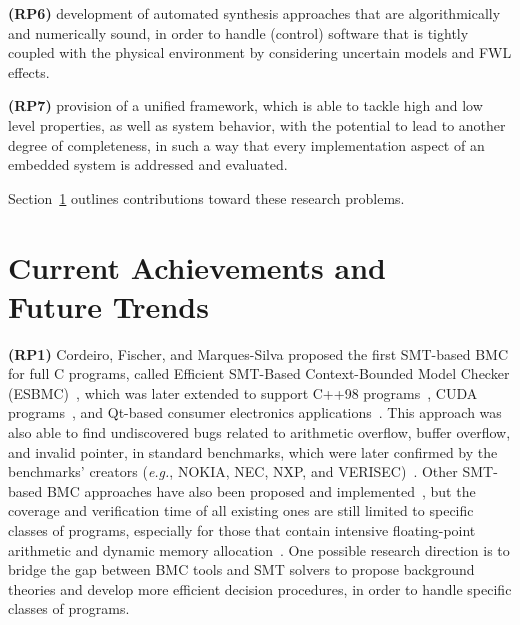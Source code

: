 \documentclass{acm_sen_article}
\begin{document}
\textbf{(RP6)} development of automated synthesis approaches that are algorithmically and numerically sound, in order to handle (control) software that is tightly coupled with the physical environment by considering uncertain models and FWL effects.

\textbf{(RP7)} provision of a unified framework, which is able to tackle high and low level properties, as well as system behavior, with the potential to lead to another degree of completeness, in such a way that every implementation aspect of an embedded system is addressed and evaluated.


Section~\ref{achievements} outlines contributions toward these research problems.



\section{Current Achievements and \\ Future Trends}
\label{achievements}

\textbf{(RP1)} Cordeiro, Fischer, and Marques-Silva proposed the first SMT-based BMC for full C programs, called Efficient SMT-Based Context-Bounded Model Checker (ESBMC)~\cite{Cordeiro12}, which was later extended to support C++98 programs~\cite{ECBS13}, CUDA programs~\cite{Pereira15}, and Qt-based consumer electronics applications~\cite{Sousa15}. This approach was also able to find undiscovered bugs related to arithmetic overflow, buffer overflow, and invalid pointer, in standard benchmarks, which were later confirmed by the benchmarks' creators ({\it e.g.}, NOKIA, NEC, NXP, and VERISEC)~\cite{CordeiroF11,Cordeiro12}. Other SMT-based BMC approaches have also been proposed and implemented~\cite{MerzFS12}, but the coverage and verification time of all existing ones are still limited to specific classes of programs, especially for those that contain intensive floating-point arithmetic and dynamic memory allocation~\cite{Beyer14,BeyerSVCOMP15}. One possible research direction is to bridge the gap between BMC tools and SMT solvers to propose background theories and develop more efficient decision procedures, in order to handle specific classes of programs.
\end{document}
